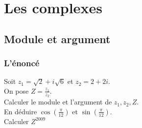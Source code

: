 \documentclass[a4paper,11pt]{book}
\begin{document}
\chapter{Les complexes}
\section{Module et argument } 
\subsection{L'\'enonc\'e}
Soit $z_1=\sqrt 2+i\sqrt6$ et $z_2=2+2i$.\\
On pose $\displaystyle Z=\frac{z_1}{z_2}$.\\
Calculer le module  et l'argument de $z_1,z_2,Z$.\\
En d\'eduire $\cos(\frac{\pi}{12})$ et $\sin(\frac{\pi}{12})$.\\
Calculer $Z^{2009}$
\end{document}
